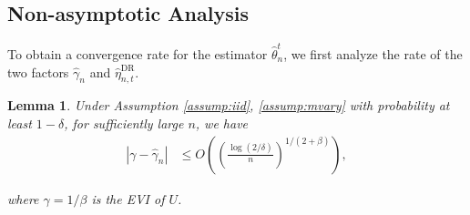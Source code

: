 \documentclass[12pt]{article}
\theoremstyle{plain}
\newtheorem{lemma}[theorem]{Lemma}
\theoremstyle{definition}
\begin{document}
\subsection{Non-asymptotic Analysis}

To obtain a convergence rate for the estimator $\hat{\theta}_n^t$, we first analyze the rate of the two factors $\hat{\gamma}_n$ and $\hat{\eta}_{n,t}^{\text{DR}}$.

\begin{lemma}
  \label{lemma:mu_rate}Under Assumption \ref{assump:iid}, \ref{assump:mvary}
  with probability at least $1 - \delta$, for sufficiently large $n$, we have
  \begin{align*}
    | \gamma - \hat{\gamma}_n | & \leqslant O \left( \left( \frac{\log (2 /
    \delta)}{n} \right)^{1 / (2 + \beta)} \right),
  \end{align*}
  
  where $\gamma = 1 / \beta$ is the EVI of $U$. 
\end{lemma}
\end{document}
